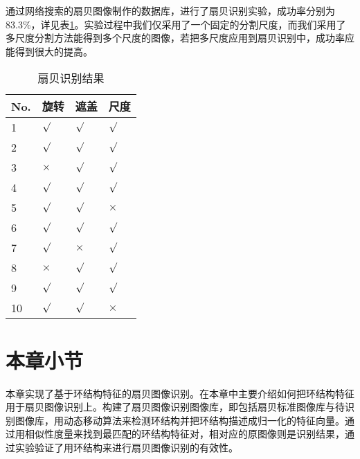 通过网络搜索的扇贝图像制作的数据库，进行了扇贝识别实验，成功率分别为83.3\%，详见表\ref{tab:recognition}。实验过程中我们仅采用了一个固定的分割尺度，而我们采用了多尺度分割方法能得到多个尺度的图像，若把多尺度应用到扇贝识别中，成功率应能得到很大的提高。
\begin{table}
\caption{扇贝识别结果}
\centering
\begin{tabular}{p{1cm}<{\centering}p{1cm}<{\centering}p{1cm}<{\centering}p{1cm}<{\centering}}
  \hline
  No. & 旋转 & 遮盖 & 尺度\\
  \hline
  \rowcolor{gray!50}
  1 & $\surd$  & $\surd$     & $\surd$ \\
  2 & $\surd$  & $\surd$     & $\surd$ \\
  \rowcolor{gray!50}
  3 & $\times$  & $\surd$  & $\surd$\\
  4 & $\surd$  & $\surd$  & $\surd$ \\
  \rowcolor{gray!50}
  5 & $\surd$     & $\surd$     & $\times$\\
  6 & $\surd$      & $\surd$      & $\surd$\\
  \rowcolor{gray!50}
  7 & $\surd$  & $\times$      & $\surd$  \\
  8 & $\times$  & $\surd$  & $\surd$ \\
  \rowcolor{gray!50}
  9 & $\surd$ & $\surd$  & $\surd$\\
  10 & $\surd$  & $\surd$  & $\times$ \\
  \hline
\end{tabular}
\label{tab:recognition}
\end{table}

\section{本章小节}
\label{}
本章实现了基于环结构特征的扇贝图像识别。在本章中主要介绍如何把环结构特征用于扇贝图像识别上。构建了扇贝图像识别图像库，即包括扇贝标准图像库与待识别图像库，用动态移动算法来检测环结构并把环结构描述成归一化的特征向量。通过用相似性度量来找到最匹配的环结构特征对，相对应的原图像则是识别结果，通过实验验证了用环结构来进行扇贝图像识别的有效性。

